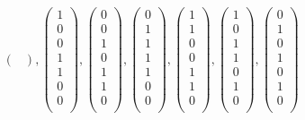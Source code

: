 \documentclass{scrreprt}
\begin{document}
\begin{enumerate}[(a)]
\[{\begin{pmatrix}
      \end{pmatrix},
      \begin{pmatrix}
        1 \\
        0 \\
        0 \\
        1 \\
        1 \\
        0 \\
        0 \\
      \end{pmatrix},
      \begin{pmatrix}
        0 \\
        0 \\
        1 \\
        0 \\
        1 \\
        1 \\
        0 \\
      \end{pmatrix},
      \begin{pmatrix}
        0 \\
        1 \\
        1 \\
        1 \\
        1 \\
        0 \\
        0 \\
      \end{pmatrix},
      \begin{pmatrix}
        1 \\
        1 \\
        0 \\
        0 \\
        1 \\
        1 \\
        0 \\
      \end{pmatrix},
      \begin{pmatrix}
        1 \\
        0 \\
        1 \\
        1 \\
        0 \\
        1 \\
        0 \\
      \end{pmatrix},
      \begin{pmatrix}
        0 \\
        1 \\
        0 \\
        1 \\
        0 \\
        1 \\
        0 \\
      \end{pmatrix}
    }
  \]
\end{enumerate}
\end{document}

